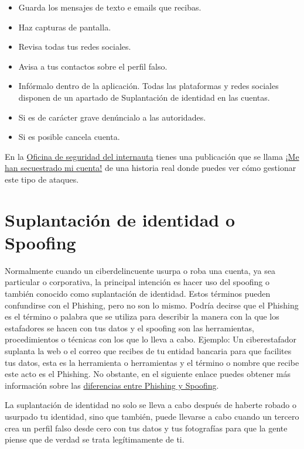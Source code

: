 \documentclass[
  a4paper,
  openany]{book}
\begin{document}
\begin{itemize}
\item
  Guarda los mensajes de texto e emails que recibas.
\item
  Haz capturas de pantalla.
\item
  Revisa todas tus redes sociales.
\item
  Avisa a tus contactos sobre el perfil falso.
\item
  Infórmalo dentro de la aplicación. Todas las plataformas y redes sociales disponen de un apartado de Suplantación de identidad en las cuentas.
\item
  Si es de carácter grave denúncialo a las autoridades.
\item
  Si es posible cancela cuenta.
\end{itemize}

En la \href{https://www.osi.es/es}{Oficina de seguridad del internauta} tienes una publicación que se llama \href{https://www.osi.es/es/actualidad/historias-reales/2021/03/05/me-han-secuestrado-mi-cuenta}{¡Me han secuestrado mi cuenta!} de una historia real donde puedes ver cómo gestionar este tipo de ataques.

\hypertarget{suplantaciuxf3n-de-identidad-o-spoofing}{%
\section{Suplantación de identidad o Spoofing}\label{suplantaciuxf3n-de-identidad-o-spoofing}}

Normalmente cuando un ciberdelincuente usurpa o roba una cuenta, ya sea particular o corporativa, la principal intención es hacer uso del spoofing o también conocido como suplantación de identidad. Estos términos pueden confundirse con el Phishing, pero no son lo mismo. Podría decirse que el Phishing es el término o palabra que se utiliza para describir la manera con la que los estafadores se hacen con tus datos y el spoofing son las herramientas, procedimientos o técnicas con los que lo lleva a cabo. Ejemplo: Un ciberestafador suplanta la web o el correo que recibes de tu entidad bancaria para que facilites tus datos, esta es la herramienta o herramientas y el término o nombre que recibe este acto es el Phishing. No obstante, en el siguiente enlace puedes obtener más información sobre las \href{https://techlandia.com/diferencia-phishing-spoofing-info_241711/}{diferencias entre Phishing y Spoofing}.

La suplantación de identidad no solo se lleva a cabo después de haberte robado o usurpado tu identidad, sino que también, puede llevarse a cabo cuando un tercero crea un perfil falso desde cero con tus datos y tus fotografías para que la gente piense que de verdad se trata legítimamente de ti.
\end{document}
